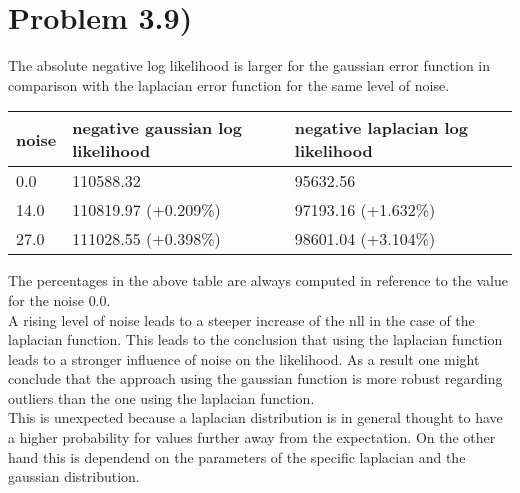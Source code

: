\documentclass[11pt]{article} %
\begin{document}
 	\section*{Problem 3.9)}
 	The absolute negative log likelihood is larger for the gaussian error function in comparison with the laplacian error function for the same level of noise.\\
 	\begin{center}
 	\begin{tabular}{ | l | l | l | }
 		\hline
 		noise  & negative gaussian log likelihood & negative laplacian log likelihood \\ \hline
 		0.0 & 110588.32 & 95632.56 \\ \hline   
 		14.0 & 110819.97 (+0.209\%) & 97193.16 (+1.632\%) \\ \hline
  		27.0 & 111028.55 (+0.398\%) & 98601.04 (+3.104\%) \\ \hline
 	\end{tabular}
 	\end{center}
 	The percentages in the above table are always computed in reference to the value for the noise $0.0$.\\
 	A rising level of noise leads to a steeper increase of the nll in the case of the laplacian function. This leads to the conclusion that using the laplacian function leads to a stronger influence of noise on the likelihood.
 	As a result one might conclude that the approach using the gaussian function is more robust regarding outliers than the one using the laplacian function.\\
 	This is unexpected because a laplacian distribution is in general thought to have a higher probability for values further away from the expectation. On the other hand this is dependend on the parameters of the specific laplacian and the gaussian distribution. 
	
\end{document}
